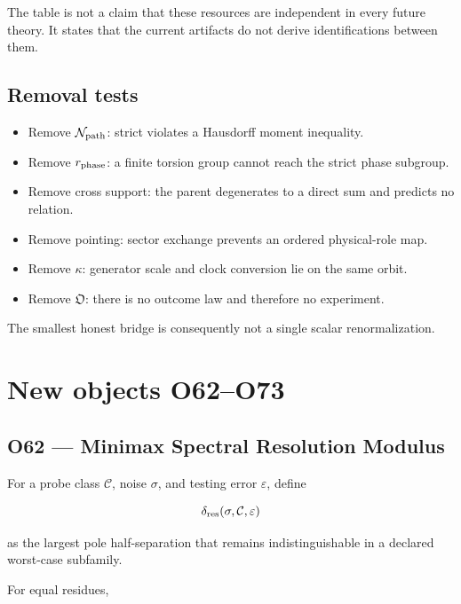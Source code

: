 \documentclass[11pt,a4paper,openany]{report}
\begin{document}
The table is not a claim that these resources are independent in every future theory. It states that the current artifacts do not derive identifications between them.

\section{Removal tests}

\begin{itemize}
\item 
Remove \(\mathcal N_{\rm path}\): strict violates a Hausdorff moment inequality.

\item 
Remove \(r_{\rm phase}\): a finite torsion group cannot reach the strict phase subgroup.

\item 
Remove cross support: the parent degenerates to a direct sum and predicts no relation.

\item 
Remove pointing: sector exchange prevents an ordered physical-role map.

\item 
Remove \(\kappa\): generator scale and clock conversion lie on the same orbit.

\item 
Remove \(\mathfrak O\): there is no outcome law and therefore no experiment.

\end{itemize}

The smallest honest bridge is consequently not a single scalar renormalization.

\chapter{New objects O62--O73}

\section{O62 --- Minimax Spectral Resolution Modulus}

For a probe class \(\mathcal C\), noise \(\sigma\), and testing error \(\varepsilon\), define

\[
\delta_{\rm res}(\sigma,\mathcal C,\varepsilon)
\]

as the largest pole half-separation that remains indistinguishable in a declared worst-case subfamily.

For equal residues,
\end{document}
